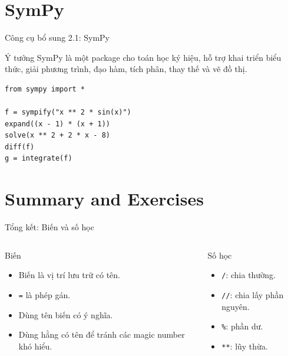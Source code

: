 \documentclass[aspectratio=169,10pt]{beamer}
\begin{document}
\section{SymPy}


\begin{frame}[fragile]{Công cụ bổ sung 2.1: SymPy}
\begin{block}{Ý tưởng}
SymPy là một package cho toán học ký hiệu, hỗ trợ khai triển biểu thức, giải phương trình, đạo hàm, tích phân, thay thế và vẽ đồ thị.
\end{block}
\begin{lstlisting}
from sympy import *

f = sympify("x ** 2 * sin(x)")
expand((x - 1) * (x + 1))
solve(x ** 2 + 2 * x - 8)
diff(f)
g = integrate(f)
\end{lstlisting}
\end{frame}

\section{Summary and Exercises}

\begin{frame}{Tổng kết: Biến và số học}
\begin{columns}[T,onlytextwidth]
\begin{block}{Biến}
\small
\begin{itemize}
  \item Biến là vị trí lưu trữ có tên.
  \item \texttt{=} là phép gán.
  \item Dùng tên biến có ý nghĩa.
  \item Dùng hằng có tên để tránh các magic number khó hiểu.
\end{itemize}
\end{block}
\begin{block}{Số học}
\small
\begin{itemize}
  \item \texttt{/}: chia thường.
  \item \texttt{//}: chia lấy phần nguyên.
  \item \texttt{\%}: phần dư.
  \item \texttt{**}: lũy thừa.
\end{itemize}
\end{block}
\end{columns}
\end{frame}
\end{document}

